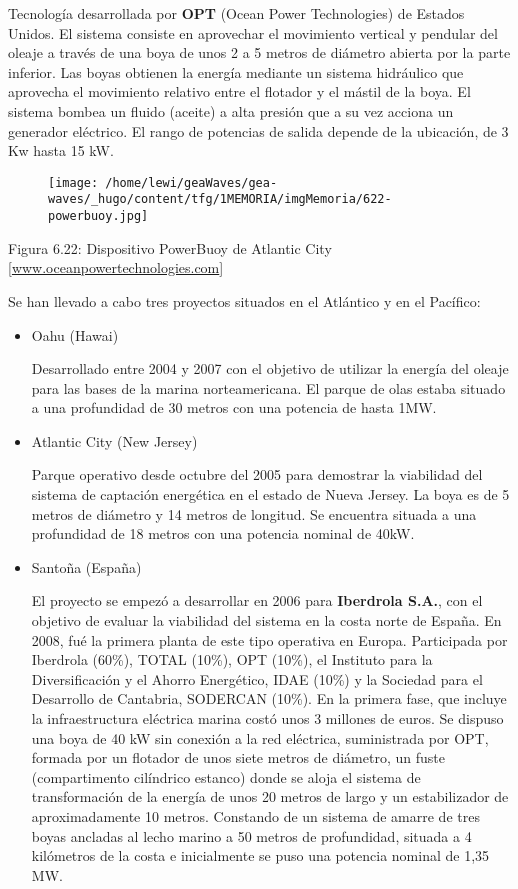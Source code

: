 \documentclass[]{article}
\begin{document}
\begin{itemize}
  Tecnología desarrollada por \textbf{OPT} (Ocean Power Technologies) de
  Estados Unidos. El sistema consiste en aprovechar el movimiento
  vertical y pendular del oleaje a través de una boya de unos 2 a 5
  metros de diámetro abierta por la parte inferior. Las boyas obtienen
  la energía mediante un sistema hidráulico que aprovecha el movimiento
  relativo entre el flotador y el mástil de la boya. El sistema bombea
  un fluido (aceite) a alta presión que a su vez acciona un generador
  eléctrico. El rango de potencias de salida depende de la ubicación, de
  3 Kw hasta 15 kW.

  \begin{figure}
  \centering
  \texttt{[image: /home/lewi/geaWaves/gea-waves/\_hugo/content/tfg/1MEMORIA/imgMemoria/622-powerbuoy.jpg]}
  \caption{}
  \end{figure}

  Figura 6.22: Dispositivo PowerBuoy de Atlantic City
  {[}\url{www.oceanpowertechnologies.com}{]}

  Se han llevado a cabo tres proyectos situados en el Atlántico y en el
  Pacífico:

  \begin{itemize}
  \item
    Oahu (Hawai)

    Desarrollado entre 2004 y 2007 con el objetivo de utilizar la
    energía del oleaje para las bases de la marina norteamericana. El
    parque de olas estaba situado a una profundidad de 30 metros con una
    potencia de hasta 1MW. 
  \item
    Atlantic City (New Jersey)

    Parque operativo desde octubre del 2005 para demostrar la viabilidad
    del sistema de captación energética en el estado de Nueva Jersey. La
    boya es de 5 metros de diámetro y 14 metros de longitud. Se
    encuentra situada a una profundidad de 18 metros con una potencia
    nominal de 40kW.
  \item
    Santoña (España)

    El proyecto se empezó a desarrollar en 2006 para \textbf{Iberdrola
    S.A.}, con el objetivo de evaluar la viabilidad del sistema en la
    costa norte de España. En 2008, fué la primera planta de este tipo
    operativa en Europa. Participada por Iberdrola (60\%), TOTAL (10\%),
    OPT (10\%), el Instituto para la Diversificación y el Ahorro
    Energético, IDAE (10\%) y la Sociedad para el Desarrollo de
    Cantabria, SODERCAN (10\%). En la primera fase, que incluye la
    infraestructura eléctrica marina costó unos 3 millones de euros. Se
    dispuso una boya de 40 kW sin conexión a la red eléctrica,
    suministrada por OPT, formada por un flotador de unos siete metros
    de diámetro, un fuste (compartimento cilíndrico estanco) donde se
    aloja el sistema de transformación de la energía de unos 20 metros
    de largo y un estabilizador de aproximadamente 10 metros. Constando
    de un sistema de amarre de tres boyas ancladas al lecho marino a 50
    metros de profundidad, situada a 4 kilómetros de la costa e
    inicialmente se puso una potencia nominal de 1,35 MW.


\end{itemize}
\end{itemize}
\end{document}
